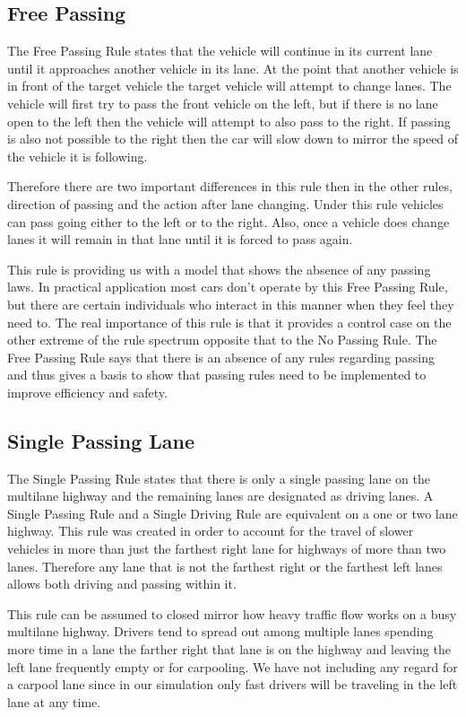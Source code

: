 \documentclass{amsart}
\begin{document}
	\subsection{Free Passing}
	The Free Passing Rule states that the vehicle will continue in its current lane until it approaches another vehicle in its lane.  At the point that another vehicle is in front of the target vehicle the target vehicle will attempt to change lanes.  The vehicle will first try to pass the front vehicle on the left, but if there is no lane open to the left then the vehicle will attempt to also pass to the right.  If passing is also not possible to the right then the car will slow down to mirror the speed of the vehicle it is following. 

	Therefore there are two important differences in this rule then in the other rules, direction of passing and the action after lane changing.  Under this rule vehicles can pass going either to the left or to the right.  Also, once a vehicle does change lanes it will remain in that lane until it is forced to pass again.  

	This rule is providing us with a model that shows the absence of any passing laws.  In practical application most cars don’t operate by this Free Passing Rule, but there are certain individuals who interact in this manner when they feel they need to.  The real importance of this rule is that it provides a control case on the other extreme of the rule spectrum opposite that to the No Passing Rule.  The Free Passing Rule says that there is an absence of any rules regarding passing and thus gives a basis to show that passing rules need to be implemented to improve efficiency and safety. 
	
	\subsection{Single Passing Lane}
	The Single Passing Rule states that there is only a single passing lane on the multilane highway and the remaining lanes are designated as driving lanes.  A Single Passing Rule and a Single Driving Rule are equivalent on a one or two lane highway.  This rule was created in order to account for the travel of slower vehicles in more than just the farthest right lane for highways of more than two lanes.  Therefore any lane that is not the farthest right or the farthest left lanes allows both driving and passing within it. 
	
	This rule can be assumed to closed mirror how heavy traffic flow works on a busy multilane highway.  Drivers tend to spread out among multiple lanes spending more time in a lane the farther right that lane is on the highway and leaving the left lane frequently empty or for carpooling.  We have not including any regard for a carpool lane since in our simulation only fast drivers will be traveling in the left lane at any time.   
	
\end{document}
